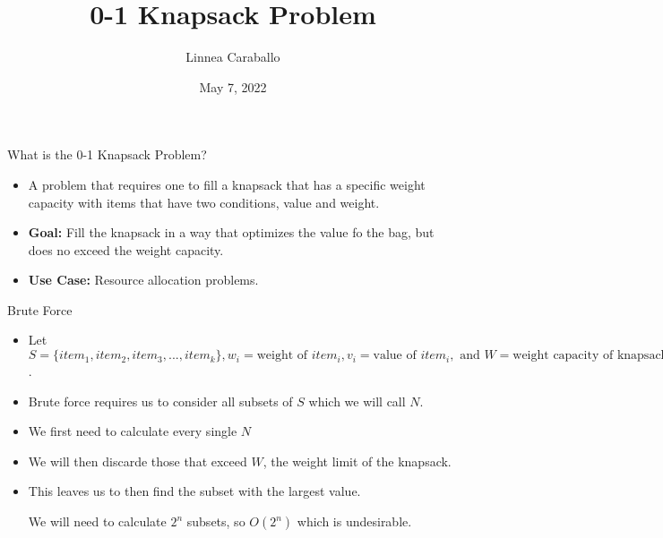 \documentclass{beamer}
\title{0-1 Knapsack Problem}
\author[Linnea Caraballo]{{\large Linnea Caraballo }}
\institute[Sacred Heart University]{CS 341 Professor Pinto}
\date{May 7, 2022}
\begin{document}
	
	\maketitle
	
	\begin{frame}{What is the 0-1 Knapsack Problem?}
		\begin{itemize}
			\item A problem that requires one to fill a knapsack that has a specific weight capacity with items that have two conditions, value and weight.
			\item \textbf{Goal:} Fill the knapsack in a way that optimizes the value fo the bag, but does no exceed the weight capacity. 
			\item \textbf{Use Case:} Resource allocation problems. 
		\end{itemize}
	\end{frame}

	\begin{frame}{Brute Force}
		\begin{itemize}
			\item Let $S = \{item_1, item_2, item_3, ..., item_k\}, w_i = \mbox{weight of } item_i, v_i = \mbox{value of } item_i, \mbox{ and } W = \mbox{weight capacity of knapsack}$. 
			\item Brute force requires us to consider all subsets of $S$ which we will call $N$.
			\item We first need to calculate every single $N$
			\item We will then discarde those that exceed $W$, the weight limit of the knapsack. 
			\item This leaves us to then find the subset with the largest value. 
			\begin{tcolorbox}
				We will need to calculate $2^n$ subsets, so $O(2^n)$ which is undesirable.
			\end{tcolorbox}
		\end{itemize}
	\end{frame}
\end{document}
